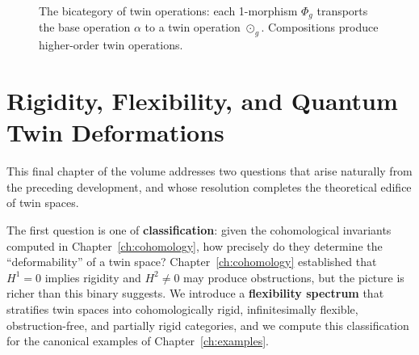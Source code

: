 \documentclass[11pt,a4paper,openany]{book}
\theoremstyle{plain}
\theoremstyle{definition}
\newcommand{\twing}[1]{\odot_{#1}}
\begin{document}
\begin{figure}[ht]
\centering
{}
\caption{The bicategory of twin operations: each 1-morphism $\Phi_g$ transports the base operation $\alpha$ to a twin operation $\twing{g}$. Compositions produce higher-order twin operations.}
\label{fig:bicat}
\end{figure}

\chapter{Rigidity, Flexibility, and Quantum Twin Deformations}
\label{ch:quantum}

This final chapter of the volume addresses two questions that arise naturally from the preceding development, and whose resolution completes the theoretical edifice of twin spaces.

The first question is one of \textbf{classification}: given the cohomological invariants computed in Chapter~\ref{ch:cohomology}, how precisely do they determine the ``deformability'' of a twin space? Chapter~\ref{ch:cohomology} established that $H^1 = 0$ implies rigidity and $H^2 \neq 0$ may produce obstructions, but the picture is richer than this binary suggests. We introduce a \textbf{flexibility spectrum} that stratifies twin spaces into cohomologically rigid, infinitesimally flexible, obstruction-free, and partially rigid categories, and we compute this classification for the canonical examples of Chapter~\ref{ch:examples}.
\end{document}
